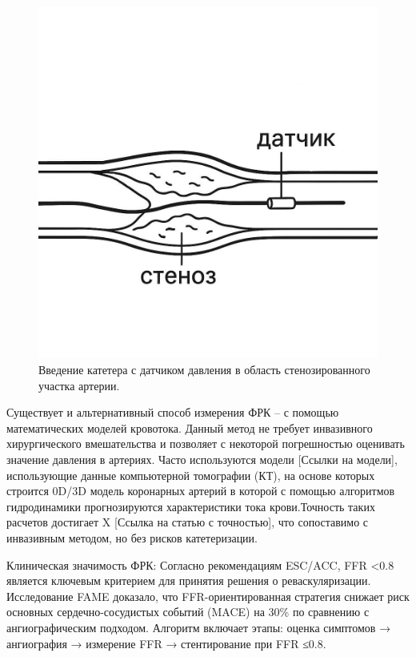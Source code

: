 \begin{figure}
	\centering
	\includegraphics[]{images/chap1/pressure_wire.jpg}
	\caption{Введение катетера с датчиком давления в область стенозированного участка артерии.}
	\label{fig:2}
\end{figure}

Существует и альтернативный способ измерения ФРК -- с помощью математических моделей кровотока. Данный метод не требует инвазивного хирургического вмешательства и позволяет с некоторой погрешностью оценивать значение давления в артериях. Часто используются модели [Ссылки на модели], использующие данные компьютерной томографии (КТ), на основе которых строится 0D/3D модель коронарных артерий в которой с помощью алгоритмов гидродинамики прогнозируются характеристики тока крови.Точность таких расчетов достигает X [Ссылка на статью с точностью], что сопоставимо с инвазивным методом, но без рисков катетеризации.

Клиническая значимость ФРК:
{Согласно рекомендациям ESC/ACC, FFR <0.8 является ключевым критерием для принятия решения о реваскуляризации. Исследование FAME доказало, что FFR-ориентированная стратегия снижает риск основных сердечно-сосудистых событий (MACE) на 30\% по сравнению с ангиографическим подходом. Алгоритм включает этапы: оценка симптомов → ангиография → измерение FFR → стентирование при FFR ≤0.8.}


